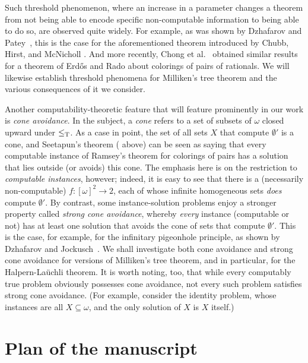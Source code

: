  
Such threshold phenomenon, where an increase in a parameter changes a theorem from not being able to encode specific non-computable information to being able to do so, are observed quite widely. For example, as was shown by Dzhafarov and Patey~\cite{Dzhafarov2017Coloring}, this is the case for the aforementioned theorem introduced by Chubb, Hirst, and McNicholl \cite{Chubb2009Reverse}. And more recently, Chong et al.~\cite{Chong2019Strengthc} obtained similar results for a theorem of Erd\H{o}s and Rado about colorings of pairs of rationals. We will likewise establish threshold phenomena for Milliken's tree theorem and the various consequences of it we consider.

Another computability-theoretic feature that will feature prominently in our work is \emph{cone avoidance}. In the subject, a \emph{cone} refers to a set of subsets of $\omega$ closed upward under $\leq_{\text{\upshape T}}$. As a case in point, the set of all sets $X$ that compute $\emptyset'$ is a cone, and Seetapun's theorem ( above) can be seen as saying that every computable instance of Ramsey's theorem for colorings of pairs has a solution that lies outside (or avoids) this cone. The emphasis here is on the restriction to \emph{computable instances}, however; indeed, it is easy to see that there is a (necessarily non-computable) $f: [\omega]^2 \to 2$, each of whose infinite homogeneous sets \emph{does} compute $\emptyset'$. By contrast, some instance-solution problems enjoy a stronger property called \emph{strong cone avoidance}, whereby \emph{every} instance (computable or not) has at least one solution that avoids the cone of sets that compute $\emptyset'$. This is the case, for example, for the infinitary pigeonhole principle, as shown by Dzhafarov and Jockusch~\cite[Lemma 3.2]{Dzhafarov2009Ramseys}. We shall investigate both cone avoidance and strong cone avoidance for versions of Milliken's tree theorem, and in particular, for the Halpern-La\"{u}chli theorem. It is worth noting, too, that while every computably true problem obviously possesses cone avoidance, not every such problem satisfies strong cone avoidance. (For example, consider the identity problem, whose instances are all $X \subseteq \omega$, and the only solution of $X$ is $X$ itself.)
 
\section{Plan of the manuscript}

